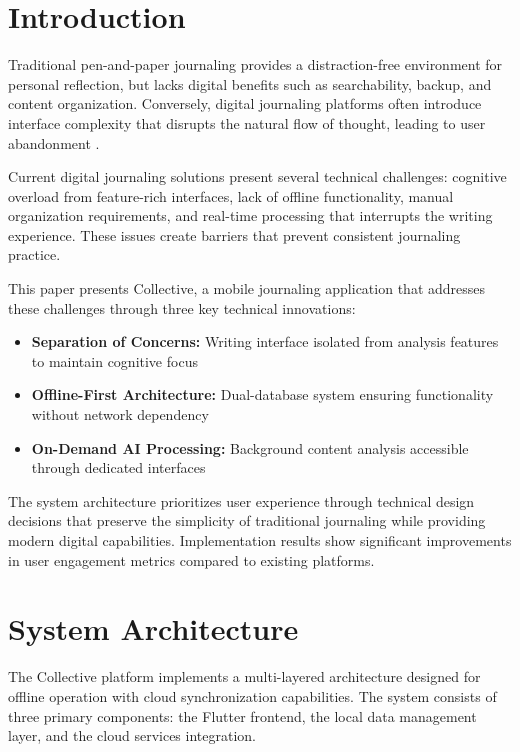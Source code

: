 \documentclass[conference]{IEEEtran}
\begin{document}
\thispagestyle{firstpagefooter}

\section{Introduction}

Traditional pen-and-paper journaling provides a distraction-free environment for personal reflection, but lacks digital benefits such as searchability, backup, and content organization. Conversely, digital journaling platforms often introduce interface complexity that disrupts the natural flow of thought, leading to user abandonment \cite{pennebaker1999forming}.

Current digital journaling solutions present several technical challenges: cognitive overload from feature-rich interfaces, lack of offline functionality, manual organization requirements, and real-time processing that interrupts the writing experience. These issues create barriers that prevent consistent journaling practice.

This paper presents Collective, a mobile journaling application that addresses these challenges through three key technical innovations:

\begin{itemize}
\item \textbf{Separation of Concerns:} Writing interface isolated from analysis features to maintain cognitive focus
\item \textbf{Offline-First Architecture:} Dual-database system ensuring functionality without network dependency
\item \textbf{On-Demand AI Processing:} Background content analysis accessible through dedicated interfaces
\end{itemize}

The system architecture prioritizes user experience through technical design decisions that preserve the simplicity of traditional journaling while providing modern digital capabilities. Implementation results show significant improvements in user engagement metrics compared to existing platforms.

\section{System Architecture}

The Collective platform implements a multi-layered architecture designed for offline operation with cloud synchronization capabilities. The system consists of three primary components: the Flutter frontend, the local data management layer, and the cloud services integration.
\end{document}
